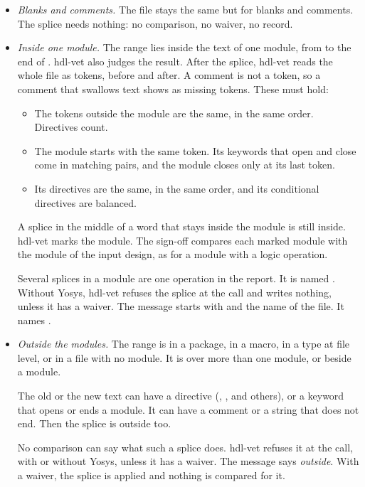 \begin{itemize}
\item \emph{Blanks and comments.} The file stays the same but for blanks and comments.
  The splice needs nothing: no comparison, no waiver, no record.
\item \emph{Inside one module.} The range lies inside the text of one module, from
   to the end of . hdl-vet also judges the result. After the
  splice, hdl-vet reads the whole file as tokens, before and after. A comment is not a
  token, so a comment that swallows text shows as missing tokens. These must hold:
  \begin{itemize}
  \item The tokens outside the module are the same, in the same order. Directives count.
  \item The module starts with the same token. Its keywords that open and close come in
    matching pairs, and the module closes only at its last token.
  \item Its directives are the same, in the same order, and its conditional directives
    are balanced.
  \end{itemize}

  A splice in the middle of a word that stays inside the module is still inside. hdl-vet
  marks the module. The sign-off compares each marked module with the module of the input
  design, as for a module with a logic operation.

  Several splices in a module are one operation in the report. It is named
  . Without Yosys, hdl-vet refuses the splice at the call and writes
  nothing, unless it has a waiver. The message starts with  and the name of
  the file. It names .
\item \emph{Outside the modules.} The range is in a package, in a macro, in a type at file
  level, or in a file with no module. It is over more than one module, or beside a module.

  The old or the new text can have a directive (, ,
   and others), or a keyword that opens or ends a module. It can have a
  comment or a string that does not end. Then the splice is outside too.

  No comparison can say what such a splice does. hdl-vet refuses it at the call, with or
  without Yosys, unless it has a waiver. The message says \emph{outside}. With a waiver,
  the splice is applied and nothing is compared for it.
\end{itemize}

